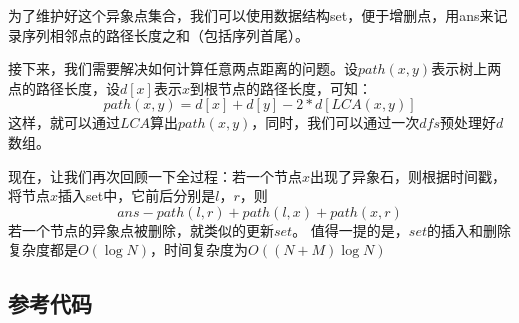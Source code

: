 \documentclass[UTF8]{ctexart}
\begin{document}
	为了维护好这个异象点集合，我们可以使用数据结构set，便于增删点，用ans来记录序列相邻点的路径长度之和（包括序列首尾）。
	
	接下来，我们需要解决如何计算任意两点距离的问题。设$path(x,y)$表示树上两点的路径长度，设$d[x]$表示$x$到根节点的路径长度，可知：
	\begin{equation}
		path(x,y)=d[x]+d[y]-2*d[LCA(x,y)]
	\end{equation}
	这样，就可以通过$LCA$算出$path(x,y)$，同时，我们可以通过一次$dfs$预处理好$d$数组。
	
	现在，让我们再次回顾一下全过程：若一个节点$x$出现了异象石，则根据时间戳，将节点$x$插入set中，它前后分别是$l$，$r$，则
	$$ans-path(l,r)+path(l,x)+path(x,r)$$
	若一个节点的异象点被删除，就类似的更新$set$。
	值得一提的是，$set$的插入和删除复杂度都是$O(\log N)$，时间复杂度为$O((N+M)\log N)$
	\subsection{参考代码}
	
\end{document}
